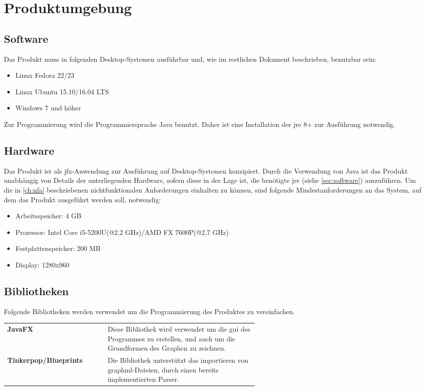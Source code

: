 \chapter{Produktumgebung}
\label{ch:umgebung}

\section{Software}\label{sec:software}
Das Produkt muss in folgenden Desktop-Systemen ausführbar und, wie im restlichen Dokument beschrieben, benutzbar sein:
\begin{itemize}
  \setlength\itemsep{0em}
  \item Linux Fedora 22/23
  \item Linux Ubuntu 15.10/16.04 LTS
  \item Windows 7 und höher
\end{itemize}
Zur Programmierung wird die Programmiersprache Java benutzt. Daher ist eine Installation der \gls{jre} 8+ zur Ausführung notwendig.

\section{Hardware}\label{sec:hardware}
Das Produkt ist als \gls{jfx}-Anwendung zur Ausführung auf Desktop-Systemen konzipiert.
Durch die Verwendung von Java ist das Produkt unabhängig von Details der unterliegenden Hardware, sofern diese in der Lage ist, die benötigte \gls{jre} (siehe \autoref{sec:software}) auszuführen.
Um die in \autoref{ch:nfa} beschriebenen nichtfunktionalen Anforderungen einhalten zu können, sind folgende Mindestanforderungen an das System, auf dem das Produkt ausgeführt werden soll, notwendig:

\begin{itemize}
  \setlength\itemsep{0em}
  \item Arbeitsspeicher: 4 GB
  \item Prozessor: Intel Core i5-5200U(@2,2 GHz)/AMD FX 7600P(@2,7 GHz)
  \item Festplattenspeicher: 200 MB 
  \item Display: 1280x960
\end{itemize}

\section{Bibliotheken}\label{sec:bibliotheken}
Folgende Bibliotheken werden verwendet um die Programmierung des Produktes zu vereinfachen. \\

\begin{tabular}{ >{\bfseries}l p{0.6 \linewidth}}
  JavaFX & Diese Bibliothek wird verwendet um die \gls{gui} des Programmes zu erstellen, und auch um die Grundformen des Graphen zu zeichnen. \\
  Tinkerpop/Blueprints & Die Bibliothek unterstützt das importieren von \gls{graphml}-Dateien, durch einen bereits implementierten Parser. \\
\end{tabular}
